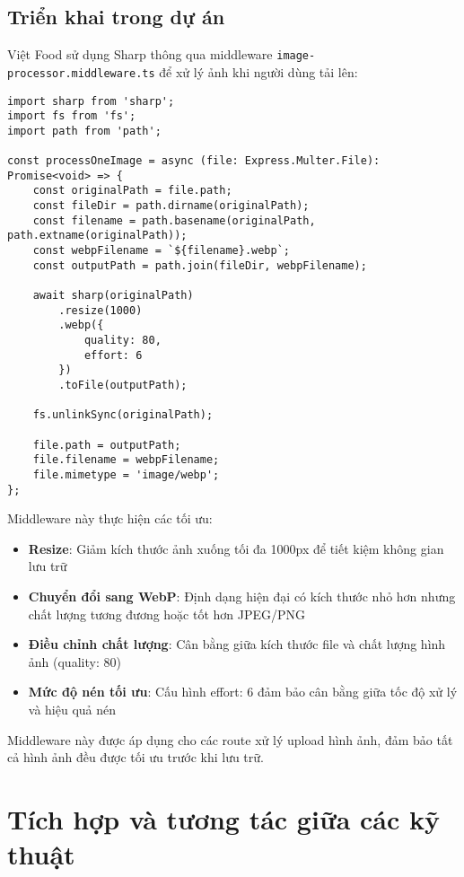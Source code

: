 \subsection{Triển khai trong dự án}
Việt Food sử dụng Sharp thông qua middleware \texttt{image-processor.middleware.ts} để xử lý ảnh khi người dùng tải lên:

\begin{verbatim}
import sharp from 'sharp';
import fs from 'fs';
import path from 'path';

const processOneImage = async (file: Express.Multer.File): Promise<void> => {
    const originalPath = file.path;
    const fileDir = path.dirname(originalPath);
    const filename = path.basename(originalPath, path.extname(originalPath));
    const webpFilename = `${filename}.webp`;
    const outputPath = path.join(fileDir, webpFilename);

    await sharp(originalPath)
        .resize(1000)
        .webp({
            quality: 80,
            effort: 6  
        })
        .toFile(outputPath);

    fs.unlinkSync(originalPath);

    file.path = outputPath;
    file.filename = webpFilename;
    file.mimetype = 'image/webp';
};
\end{verbatim}

Middleware này thực hiện các tối ưu:

\begin{itemize}
    \item \textbf{Resize}: Giảm kích thước ảnh xuống tối đa 1000px để tiết kiệm không gian lưu trữ
    \item \textbf{Chuyển đổi sang WebP}: Định dạng hiện đại có kích thước nhỏ hơn nhưng chất lượng tương đương hoặc tốt hơn JPEG/PNG
    \item \textbf{Điều chỉnh chất lượng}: Cân bằng giữa kích thước file và chất lượng hình ảnh (quality: 80)
    \item \textbf{Mức độ nén tối ưu}: Cấu hình effort: 6 đảm bảo cân bằng giữa tốc độ xử lý và hiệu quả nén
\end{itemize}

Middleware này được áp dụng cho các route xử lý upload hình ảnh, đảm bảo tất cả hình ảnh đều được tối ưu trước khi lưu trữ.

\section{Tích hợp và tương tác giữa các kỹ thuật}

